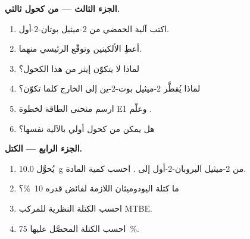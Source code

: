 \begin{problem}
\medskip
\noindent\textbf{الجزء الثالث ---  من كحول ثالثي.}
\begin{enumerate}[resume]
  \item اكتب آلية  الحمضي من
        2-ميثيل بوتان-2-أول.
  \item أعطِ الألكينين وتوقّع الرئيسي منهما.
  \item لماذا لا يتكوّن إيثر من هذا الكحول؟
  \item لماذا يُقطَّر 2-ميثيل بوت-2-ين إلى الخارج كلما تكوّن؟
  \item ارسم منحنى الطاقة لخطوة E1 وعلّم
        .
  \item هل يمكن  من كحول أولي بالآلية نفسها؟
\end{enumerate}

\medskip
\noindent\textbf{الجزء الرابع --- الكتل.}
\begin{enumerate}[resume]
  \item يُحوَّل \qty{10.0}{g} من 2-ميثيل البروبان-2-أول إلى
        . احسب كمية المادة.
  \item ما كتلة اليودوميثان اللازمة لفائض قدره \qty{10}{\percent}؟
  \item احسب الكتلة النظرية للمركب MTBE.
  \item احسب الكتلة المحصَّل عليها  \qty{75}{\percent}.
\end{enumerate}
\end{problem}

